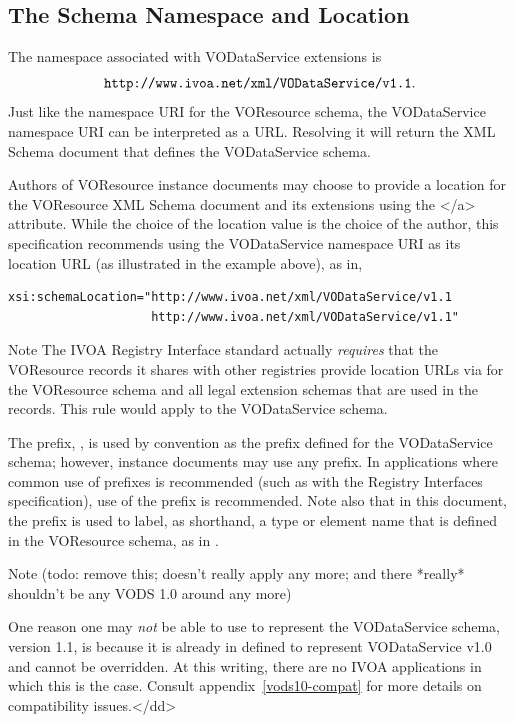 \documentclass[11pt,a4paper]{ivoa}
\begin{document}
\subsection{The Schema Namespace and Location}


The namespace associated with VODataService extensions is
$$\mbox{\texttt{http://www.ivoa.net/xml/VODataService/v1.1}}.$$
Just like the namespace URI for the VOResource schema, the
VODataService namespace URI can be interpreted as a URL.  Resolving it
will return the XML Schema document 
that defines the VODataService schema.



Authors of VOResource instance documents may choose to
provide a location for the VOResource XML Schema document and its
extensions using the
</a> attribute.  While the choice of
the location value is the choice of the author, this specification
recommends using the VODataService namespace URI as its location URL
(as illustrated in the example above), as in,

\begin{lstlisting}[language=XML]
xsi:schemaLocation="http://www.ivoa.net/xml/VODataService/v1.1
                    http://www.ivoa.net/xml/VODataService/v1.1"
\end{lstlisting}


\begin{admonition}{Note}
The IVOA Registry Interface standard \citep{todo:RI1.1}
       actually \emph{requires} that the VOResource records it
       shares with other registries provide location URLs via
        for the VOResource schema and
       all legal extension schemas that are used in the records.  This
       rule would apply to the VODataService schema.
\end{admonition}


The prefix, , is used by convention as the prefix
defined for the VODataService schema; however, instance documents may
use any prefix.  In applications where common use of prefixes is
recommended (such as with the Registry Interfaces specification),
use of the  prefix is recommended.
Note also that in this document, the  prefix is used to
label, as shorthand, a type or element name that is defined in the
VOResource schema, as in .



\begin{admonition}{Note}
(todo: remove this; doesn't really apply any more; and there *really*
shouldn't be any VODS 1.0 around any more)

One reason one may \emph{not} be able to use 
       to represent the VODataService schema, version 1.1, is because
       it is already in defined to represent VODataService v1.0 and
       cannot be overridden.  At this writing, there are no IVOA
       applications in which this is the case.  Consult
       appendix~\ref{vods10-compat} for more details on
       compatibility issues.</dd>
\end{admonition}
\end{document}
